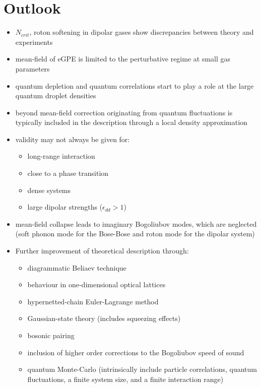 \section{Outlook}
\begin{itemize}
    \item $N_{crit}$, roton softening in dipolar gases show discrepancies between theory and experiments
    \item mean-field of eGPE is limited to the perturbative regime at small gas parameters
    \item quantum depletion and quantum correlations start to play a role at the
        large quantum droplet densities
    \item beyond mean-field correction originating from quantum fluctuations is typically included
        in the description through a local density approximation
    \item validity may not always be given for:
    \begin{itemize}
        \item long-range interaction
        \item close to a phase transition
        \item dense systems
        \item large dipolar strengths ($\epsilon_{dd} > 1$)
    \end{itemize}

    \item mean-field collapse leads to imaginary Bogoliubov modes, which are neglected
        (soft phonon mode for the Bose-Bose and roton mode for the dipolar system)
    \item Further improvement of theoretical description through:
    \begin{itemize}
        \item diagrammatic Beliaev technique
        \item behaviour in one-dimensional optical lattices
        \item hypernetted-chain Euler-Lagrange method
        \item Gaussian-state theory (includes squeezing effects)
        \item bosonic pairing
        \item inclusion of higher order corrections to the Bogoliubov speed of sound
        \item quantum Monte-Carlo (intrinsically include particle correlations, quantum fluctuations, a finite
            system size, and a finite interaction range)
    \end{itemize}


\end{itemize}
